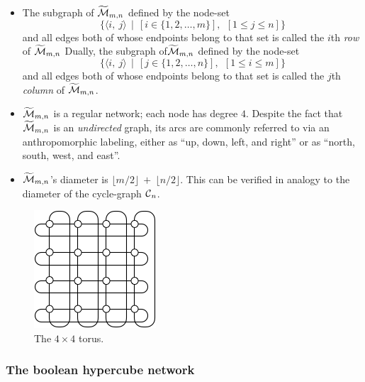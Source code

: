 \begin{itemize}
  \begin{itemize}
  \item
The subgraph of $\widetilde{\mbox{$\cal M$}}_{m,n}$ defined by the node-set
\[ \{ \langle i, \ j \rangle  \ \ | \ \ \left[i \in \{1, 2, \ldots,
  m\}\right], \ \ \left[1 \leq j \leq n\right]\}
\]
and all edges both of whose endpoints belong to that set is called the
$i$th {\it row} of $\widetilde{\mbox{$\cal M$}}_{m,n}$
Dually, the subgraph of$\widetilde{\mbox{$\cal M$}}_{m,n}$ defined by the node-set
\[ \{ \langle i, \ j \rangle  \ \ | \ \ \left[j \in \{1, 2, \ldots,
  n\}\right], \ \ \left[1 \leq i \leq m\right] \}
\]
and all edges both of whose endpoints belong to that set is called the
$j$th {\it column} of $\widetilde{\mbox{$\cal M$}}_{m,n}$.
  \item
$\widetilde{\mbox{$\cal M$}}_{m,n}$ is a regular network; each node has degree $4$.
    Despite the fact that $\widetilde{\mbox{$\cal M$}}_{m,n}$ is an {\em
      undirected} graph, its arcs are commonly referred to via an
    anthropomorphic labeling, either as ``up, down, left, and right''
    or as ``north, south, west, and east''.
  \item {}
$\widetilde{\mbox{$\cal M$}}_{m,n}$'s diameter is $\lfloor m/2 \rfloor \ + \
\lfloor n/2 \rfloor$.  This can be verified in analogy to the diameter
of the cycle-graph $\mbox{$\cal C$}_n$.
  \end{itemize}
\end{itemize}

\begin{figure}[hbt]
\begin{center}
       \includegraphics[scale=0.6]{FiguresGraph/torus}
       \caption{The $4 \times 4$ torus.}
  \label{fig:torus}
\end{center}
\end{figure}

\subsubsection{The boolean hypercube network}

